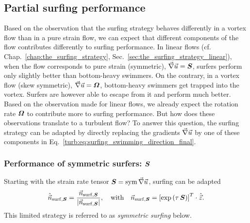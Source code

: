 \subsection{Partial surfing performance}\label{sec:partial}

Based on the observation that the surfing strategy behaves differently in a vortex flow than in a pure strain flow, we can expect that different components of the flow contributes differently to surfing performance.
In linear flows (cf. Chap.~\ref{chap:the_surfing_strategy}, Sec.~\ref{sec:the_surfing_strategy_linear}), when the flow corresponds to pure strain (symmetric), $\vec{\nabla} \vec{u} = \boldsymbol{S}$, surfers perform only slightly better than bottom-heavy swimmers.
On the contrary, in a vortex flow (skew symmetric), $\vec{\nabla} \vec{u} = \boldsymbol{\varOmega}$, bottom-heavy swimmers get trapped into the vortex. 
Surfers are however able to escape from it and perform much better.
Based on the observation made for linear flows, we already expect the rotation rate $\boldsymbol{\varOmega}$ to contribute more to surfing performance. 
But how does these observations translate to a turbulent flow?
To answer this question, the surfing strategy can be adapted by directly replacing the gradients $\vec{\nabla} \vec{u}$ by one of these components in Eq.~\eqref{turb:eq:surfing_swimming_direction_final}.

\subsubsection{Performance of symmetric surfers: $\boldsymbol{S}$}

Starting with the strain rate tensor $\boldsymbol{S} = \operatorname{sym} \vec{\nabla} \vec{u}$, surfing can be adapted
\begin{equation}\label{turb:eq:surf_partial_sym}
	\hat{\vec{n}}_{\mathrm{surf}, \boldsymbol{S}} = \frac{\vec{n}_{\mathrm{surf}, \boldsymbol{S}}}{\lvert\vec{n}_{\mathrm{surf}, \boldsymbol{S}}\rvert}, \quad \text{with} \quad \vec{n}_{\mathrm{surf}, \boldsymbol{S}} = \left[ \exp \left( \tau \, \boldsymbol{S} \right) \right]^T \cdot \hat{\vec{z}}.
\end{equation}
This limited strategy is referred to as \textit{symmetric surfing} below.

